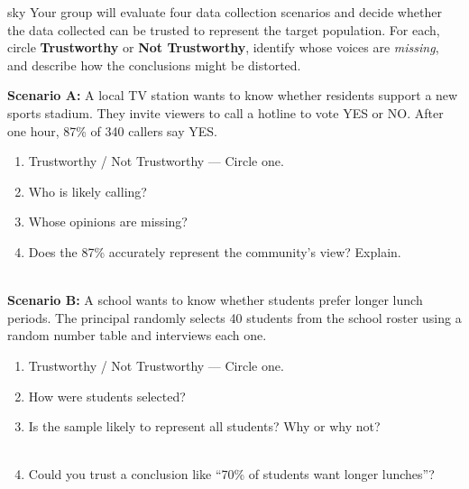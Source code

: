 \documentclass[10pt]{article}
\begin{document}
\namepartnerperiod

\vspace{0.1in}

\begin{scenariobox}[Context]{sky}
\small
Your group will evaluate four data collection scenarios and decide whether the data
collected can be trusted to represent the target population. For each, circle
\textbf{Trustworthy} or \textbf{Not Trustworthy}, identify whose voices are
\emph{missing}, and describe how the conclusions might be distorted.
\end{scenariobox}

\vspace{0.1in}

\textbf{Scenario A:} A local TV station wants to know whether residents support a new
sports stadium. They invite viewers to call a hotline to vote YES or NO.
After one hour, 87\% of 340 callers say YES.

\begin{practicebox}
\small
\begin{enumerate}[leftmargin=1.5em, itemsep=8pt]
  \item Trustworthy \quad / \quad Not Trustworthy --- Circle one.
  \item Who is likely calling? \blank{8cm}
  \item Whose opinions are missing? \blank{8cm}
  \item Does the 87\% accurately represent the community's view? Explain.\\
        \writeline\\[1pt]\writeline
\end{enumerate}
\end{practicebox}

\vspace{0.1in}

\textbf{Scenario B:} A school wants to know whether students prefer longer lunch
periods. The principal randomly selects 40 students from the school roster using
a random number table and interviews each one.

\begin{practicebox}
\small
\begin{enumerate}[leftmargin=1.5em, itemsep=8pt]
  \item Trustworthy \quad / \quad Not Trustworthy --- Circle one.
  \item How were students selected? \blank{8cm}
  \item Is the sample likely to represent all students? Why or why not?\\
        \writeline\\[1pt]\writeline
  \item Could you trust a conclusion like ``70\% of students want longer lunches''?
        \blank{5cm}
\end{enumerate}
\end{practicebox}
\end{document}

